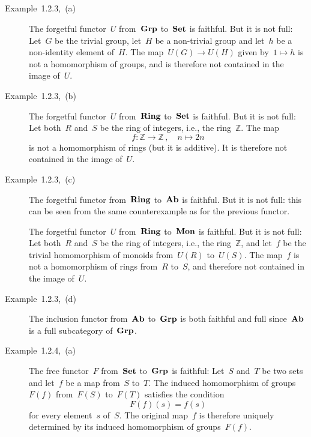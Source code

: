 \subsection{}



\subsubsection{}

\begin{description}
	
	\item[Example~1.2.3,~(a)]
		The forgetful functor~$U$ from~$\mathbf{Grp}$ to~$\mathbf{Set}$ is faithful.
		But it is not full:
		Let~$G$ be the trivial group, let~$H$ be a non-trivial group and let~$h$ be a non-identity element of~$H$.
		The map~$U(G) \to U(H)$ given by~$1 \mapsto h$ is not a homomorphism of groups, and is therefore not contained in the image of~$U$.

	\item[Example~1.2.3,~(b)]
		The forgetful functor~$U$ from~$\mathbf{Ring}$ to~$\mathbf{Set}$ is faithful.
		But it is not full:
		Let both~$R$ and~$S$ be the ring of integers, i.e., the ring~$ℤ$.
		The map
		\[
			f
			\colon
			ℤ \to ℤ \,,
			\quad
			n \mapsto 2n
		\]
		is not a homomorphism of rings (but it is additive).
		It is therefore not contained in the image of~$U$.

	\item[Example~1.2.3,~(c)]
		The forgetful functor from~$\mathbf{Ring}$ to~$\mathbf{Ab}$ is faithful.
		But it is not full:
		this can be seen from the same counterexample as for the previous functor.

		The forgetful functor~$U$ from~$\mathbf{Ring}$ to~$\mathbf{Mon}$ is faithful.
		But it is not full:
		Let both~$R$ and~$S$ be the ring of integers, i.e., the ring~$ℤ$, and let~$f$ be the trivial homomorphism of monoids from~$U(R)$ to~$U(S)$.
		The map~$f$ is not a homomorphism of rings from~$R$ to~$S$, and therefore not contained in the image of~$U$.

	\item[Example~1.2.3,~(d)]
		The inclusion functor from~$\mathbf{Ab}$ to~$\mathbf{Grp}$ is both faithful and full since~$\mathbf{Ab}$ is a full subcategory of~$\mathbf{Grp}$.

	\item[Example~1.2.4,~(a)]
		The free functor~$F$ from~$\mathbf{Set}$ to~$\mathbf{Grp}$ is faithful:
		Let~$S$ and~$T$ be two sets and let~$f$ be a map from~$S$ to~$T$.
		The induced homomorphism of groups~$F(f)$ from~$F(S)$ to~$F(T)$ satisfies the condition
		\[
			F(f)(s)
			=
			f(s)
		\]
		for every element~$s$ of~$S$.
		The original map~$f$ is therefore uniquely determined by its induced homomorphism of groups~$F(f)$.


\end{description}
